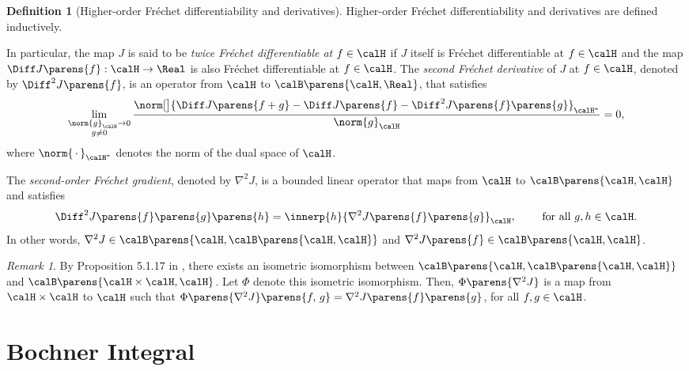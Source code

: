 \documentclass[12pt]{article}
\theoremstyle{definition}
\newtheorem{definition}{Definition}
\theoremstyle{theorem}
\theoremstyle{remark}
\newtheorem{remark}{Remark}
\begin{document}
\begin{definition}[Higher-order Fr{\'e}chet differentiability and derivatives]
	Higher-order Fr{\'e}chet differentiability and derivatives are defined inductively. 
	
	In particular, the map $J$ is said to be \textit{twice Fr{\'e}chet differentiable at $f \in \calH$} if $J$ itself is Fr{\'e}chet differentiable at $f \in \calH$ and the map $\Diff J \parens{f}: \calH \to \Real$ is also Fr{\'e}chet differentiable at $f \in \calH$. The \textit{second Fr{\'e}chet derivative} of $J$ at $f \in \calH$, denoted by $\Diff^2 J \parens{f}$, is an operator from $\calH$ to $\calB \parens{\calH, \Real}$, that satisfies 
	\begin{align}\label{eq-2ndfrederivative}
		\lim_{\substack{\norm{g}_{\calH} \to 0 \\ g \neq 0}} \frac{\norm[\big]{\Diff J \parens{f + g} - \Diff J \parens{f} - \Diff^2 J \parens{f} \parens{g} }_{\calH^*}}{\norm{g}_{\calH}} = 0, 
	\end{align}
	where $\norm{\,\cdot\,}_{\calH^*}$ denotes the norm of the dual space of $\calH$. 
	
	The \textit{second-order Fr{\'e}chet gradient}, denoted by $\nabla^2 J$, is a bounded linear operator that maps from $\calH$ to $\calB \parens{\calH, \calH}$ and satisfies 
	\begin{align*}
		\Diff^2 J \parens{f} \parens{g} \parens{h} = \innerp{h}{ \nabla^2 J \parens{f} \parens{g}}_{\calH}, \qquad \text{ for all } g, h \in \calH. 
	\end{align*}
	In other words, $\nabla^2 J \in \calB \parens{\calH, \calB \parens{\calH, \calH}}$ and $\nabla^2 J \parens{f} \in \calB \parens{\calH, \calH}$. 

\end{definition}

\begin{remark}
	By Proposition 5.1.17 in \textcite{Denkowski2013-ke}, there exists an isometric isomorphism between $\calB \parens{\calH, \calB \parens{\calH, \calH}}$ and $\calB \parens{\calH \times \calH, \calH}$. Let $\Phi$ denote this isometric isomorphism. Then, $\Phi \parens{\nabla^2 J}$ is a map from $\calH \times \calH$ to $\calH$ such that $\Phi \parens{\nabla^2 J} \parens{f, \, g} = \nabla^2 J \parens{f} \parens{g}$, for all $f, g \in \calH$. 
\end{remark}



\section{Bochner Integral}\label{section-bochner-integral}
\end{document}
